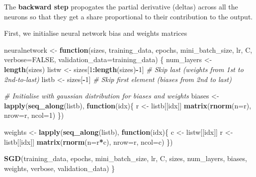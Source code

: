 \documentclass[]{book}
\newenvironment{Shaded}{\begin{snugshade}}{\end{snugshade}}
\newcommand{\CommentTok}[1]{\textcolor[rgb]{0.56,0.35,0.01}{\textit{#1}}}
\newcommand{\ControlFlowTok}[1]{\textcolor[rgb]{0.13,0.29,0.53}{\textbf{#1}}}
\newcommand{\DataTypeTok}[1]{\textcolor[rgb]{0.13,0.29,0.53}{#1}}
\newcommand{\DecValTok}[1]{\textcolor[rgb]{0.00,0.00,0.81}{#1}}
\newcommand{\KeywordTok}[1]{\textcolor[rgb]{0.13,0.29,0.53}{\textbf{#1}}}
\newcommand{\NormalTok}[1]{#1}
\newcommand{\OperatorTok}[1]{\textcolor[rgb]{0.81,0.36,0.00}{\textbf{#1}}}
\newcommand{\OtherTok}[1]{\textcolor[rgb]{0.56,0.35,0.01}{#1}}
\newcommand{\StringTok}[1]{\textcolor[rgb]{0.31,0.60,0.02}{#1}}
\begin{document}
The \textbf{backward step} propogates the partial derivative (deltas) across all the neurons so that they get a share proportional to their contribution to the output.

First, we initialise neural network bias and weights matrices

\begin{Shaded}
\begin{Highlighting}[]
\NormalTok{neuralnetwork <-}\StringTok{ }\ControlFlowTok{function}\NormalTok{(sizes, training_data, epochs, mini_batch_size, lr, C,}
                          \DataTypeTok{verbose=}\OtherTok{FALSE}\NormalTok{, }\DataTypeTok{validation_data=}\NormalTok{training_data)}
\NormalTok{\{}
\NormalTok{  num_layers <-}\StringTok{ }\KeywordTok{length}\NormalTok{(sizes)}
\NormalTok{  listw <-}\StringTok{ }\NormalTok{sizes[}\DecValTok{1}\OperatorTok{:}\KeywordTok{length}\NormalTok{(sizes)}\OperatorTok{-}\DecValTok{1}\NormalTok{] }\CommentTok{# Skip last (weights from 1st to 2nd-to-last)}
\NormalTok{  listb <-}\StringTok{  }\NormalTok{sizes[}\OperatorTok{-}\DecValTok{1}\NormalTok{]  }\CommentTok{# Skip first element (biases from 2nd to last)}
  
  \CommentTok{# Initialise with gaussian distribution for biases and weights}
\NormalTok{  biases <-}\StringTok{ }\KeywordTok{lapply}\NormalTok{(}\KeywordTok{seq_along}\NormalTok{(listb), }\ControlFlowTok{function}\NormalTok{(idx)\{}
\NormalTok{    r <-}\StringTok{ }\NormalTok{listb[[idx]]}
    \KeywordTok{matrix}\NormalTok{(}\KeywordTok{rnorm}\NormalTok{(}\DataTypeTok{n=}\NormalTok{r), }\DataTypeTok{nrow=}\NormalTok{r, }\DataTypeTok{ncol=}\DecValTok{1}\NormalTok{)}
\NormalTok{  \})}
    
\NormalTok{  weights <-}\StringTok{ }\KeywordTok{lapply}\NormalTok{(}\KeywordTok{seq_along}\NormalTok{(listb), }\ControlFlowTok{function}\NormalTok{(idx)\{}
\NormalTok{    c <-}\StringTok{ }\NormalTok{listw[[idx]]}
\NormalTok{    r <-}\StringTok{ }\NormalTok{listb[[idx]]}
    \KeywordTok{matrix}\NormalTok{(}\KeywordTok{rnorm}\NormalTok{(}\DataTypeTok{n=}\NormalTok{r}\OperatorTok{*}\NormalTok{c), }\DataTypeTok{nrow=}\NormalTok{r, }\DataTypeTok{ncol=}\NormalTok{c)}
\NormalTok{  \})}
    
  \KeywordTok{SGD}\NormalTok{(training_data, epochs, mini_batch_size, lr, C, }
\NormalTok{      sizes, num_layers, biases, weights, verbose, validation_data)}
\NormalTok{\}}
\end{Highlighting}
\end{Shaded}
\end{document}
